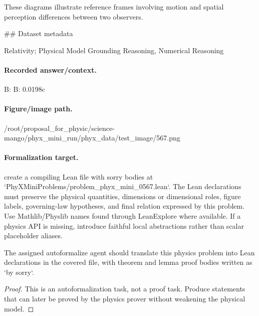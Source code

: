 These diagrams illustrate reference frames involving motion and spatial perception differences between two observers.

\#\# Dataset metadata

Relativity; Physical Model Grounding Reasoning, Numerical Reasoning

\paragraph{Recorded answer/context.}
B: B: 0.0198c

\paragraph{Figure/image path.}
/root/proposal\_for\_physic/science-mango/phyx\_mini\_run/phyx\_data/test\_image/567.png

\paragraph{Formalization target.}
create a compiling Lean file with sorry bodies at `PhyXMiniProblems/problem\_phyx\_mini\_0567.lean`. The Lean declarations must preserve the physical quantities, dimensions or dimensional roles, figure labels, governing-law hypotheses, and final relation expressed by this problem.
Use Mathlib/Physlib names found through LeanExplore where available. If a physics API is missing, introduce faithful local abstractions rather than scalar placeholder aliases.

\begin{theorem}
\label{thm:physics:phyx_mini_0567:target}
The assigned autoformalize agent should translate this physics problem into Lean declarations in the covered file, with theorem and lemma proof bodies written as `by sorry`.
\end{theorem}
\begin{proof}
This is an autoformalization task, not a proof task. Produce statements that can later be proved by the physics prover without weakening the physical model.
\end{proof}

